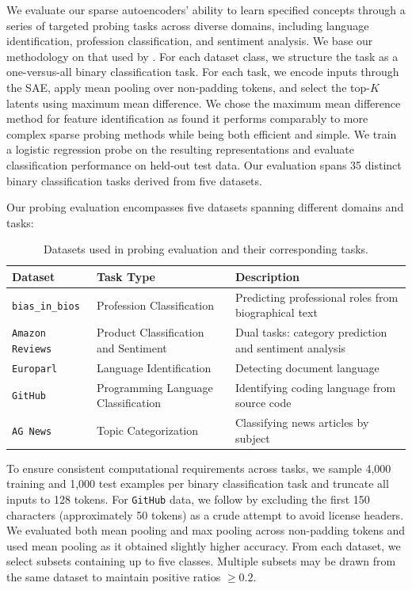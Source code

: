 \documentclass{article}
\theoremstyle{plain}
\theoremstyle{definition}
\theoremstyle{remark}
\begin{document}
We evaluate our sparse autoencoders' ability to learn specified concepts through a series of targeted probing tasks across diverse domains, including language identification, profession classification, and sentiment analysis. We base our methodology on that used by \citet{gurnee2023findingneuronshaystackcase}. For each dataset class, we structure the task as a one-versus-all binary classification task. For each task, we encode inputs through the SAE, apply mean pooling over non-padding tokens, and select the top-$K$ latents using maximum mean difference. We chose the maximum mean difference method for feature identification as \citet{gurnee2023findingneuronshaystackcase} found it performs comparably to more complex sparse probing methods while being both efficient and simple. We train a logistic regression probe on the resulting representations and evaluate classification performance on held-out test data. Our evaluation spans 35 distinct binary classification tasks derived from five datasets.

Our probing evaluation encompasses five datasets spanning different domains and tasks:

\begin{table}[h!]
\centering
\begin{tabular}{|l|l|p{8cm}|}
\hline
\textbf{Dataset} & \textbf{Task Type} & \textbf{Description} \\
\hline
\texttt{bias\_in\_bios} & Profession Classification & Predicting professional roles from biographical text \\
\hline
\texttt{Amazon Reviews} & Product Classification and Sentiment & Dual tasks: category prediction and sentiment analysis \\
\hline
\texttt{Europarl} & Language Identification & Detecting document language \\
\hline
\texttt{GitHub} & Programming Language Classification & Identifying coding language from source code \\
\hline
\texttt{AG News} & Topic Categorization & Classifying news articles by subject \\
\hline
\end{tabular}
\caption{Datasets used in probing evaluation and their corresponding tasks.}
\end{table}

To ensure consistent computational requirements across tasks, we sample 4,000 training and 1,000 test examples per binary classification task and truncate all inputs to 128 tokens. For \texttt{GitHub} data, we follow \citet{gurnee2023findingneuronshaystackcase} by excluding the first 150 characters (approximately 50 tokens) as a crude attempt to avoid license headers. We evaluated both mean pooling and max pooling across non-padding tokens and used mean pooling as it obtained slightly higher accuracy. From each dataset, we select subsets containing up to five classes. Multiple subsets may be drawn from the same dataset to maintain positive ratios $\geq 0.2$.
\end{document}
